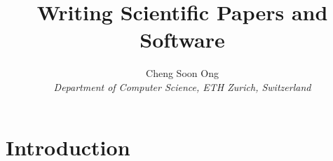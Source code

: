 \documentclass[10pt,conference,compsocconf]{IEEEtran}
\begin{document}
\title{Writing Scientific Papers and Software}

\author{
  Cheng Soon Ong\\
  \textit{Department of Computer Science, ETH Zurich, Switzerland}
}

\maketitle

\begin{abstract}
\end{abstract}

\section{Introduction}



\end{document}
